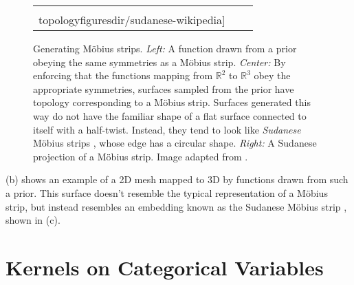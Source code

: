 \begin{figure}
\begin{tabular}[t]{ccc}
\raisebox{1cm}{\texttt{[image: \\topologyfiguresdir/sudanese-wikipedia]}}
\end{tabular}
\caption[Generating M\"{o}bius strips]{Generating M\"{o}bius strips.
\emph{Left:} A function drawn from a \sgp{} prior obeying the same symmetries as a M\"{o}bius strip.
\emph{Center:} By enforcing that the functions mapping from $\mathbb{R}^2$ to $\mathbb{R}^3$ obey the appropriate symmetries, surfaces sampled from the prior have topology corresponding to a M\"{o}bius strip.
Surfaces generated this way do not have the familiar shape of a flat surface connected to itself with a half-twist.
Instead, they tend to look like \emph{Sudanese} M\"{o}bius strips \citep{sudanese1984}, whose edge has a circular shape.
\emph{Right:} A Sudanese projection of a M\"{o}bius strip.
Image adapted from \citep{sudanesepict}.
}
\label{fig:mobius}
\end{figure}

(b) shows an example of a 2D mesh mapped to 3D by functions drawn from such a prior.
This surface doesn't resemble the typical representation of a M\"{o}bius strip,
but instead resembles an embedding known as the Sudanese M\"{o}bius strip \citep{sudanese1984}, shown in (c).




\section{Kernels on Categorical Variables}



